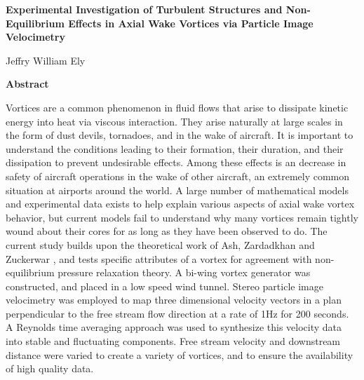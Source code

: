 \thispagestyle{plain}
\begin{center}
    \Large
    \textbf{Experimental Investigation of Turbulent Structures and 
    Non-Equilibrium Effects in Axial Wake Vortices via Particle Image 
    Velocimetry}
    
    \vspace{0.4cm}
    \large
    
    \vspace{0.4cm}
    Jeffry William Ely
    
    \vspace{0.9cm}
    \textbf{Abstract}
\end{center}


Vortices are a common phenomenon in fluid flows that arise to dissipate kinetic 
energy into heat via viscous interaction. They arise naturally at large scales 
in the form of dust devils, tornadoes, and in the wake of aircraft. It is 
important to understand the conditions leading to their formation, their 
duration, and their dissipation to prevent undesirable effects. Among these 
effects is an decrease in safety of aircraft operations in the wake of other 
aircraft, an extremely common situation at airports around the world. A large 
number of mathematical models and experimental data exists to help explain 
various aspects of axial wake vortex behavior, but current models fail to 
understand why many vortices remain tightly wound about their cores for as long 
as they have been observed to do. The current study builds upon the theoretical 
work of Ash, Zardadkhan and Zuckerwar \cite{ash2011}, and tests specific 
attributes of a vortex for agreement with non-equilibrium pressure relaxation 
theory. A bi-wing vortex generator was constructed, and placed in a low speed 
wind tunnel. Stereo particle image velocimetry was employed to map three 
dimensional velocity vectors in a plan perpendicular to the free stream flow 
direction at a rate of 1Hz for 200 seconds. A Reynolds time averaging approach 
was used to synthesize this velocity data into stable and fluctuating 
components. Free stream velocity and downstream distance were varied to create 
a variety of vortices, and to ensure the availability of high quality data.

